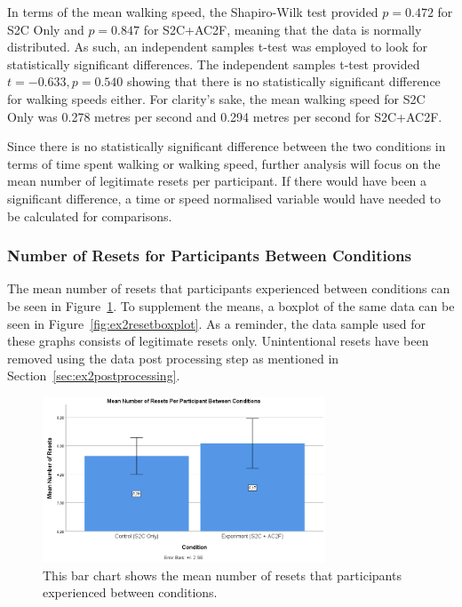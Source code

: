 In terms of the mean walking speed, the Shapiro-Wilk test provided $p = 0.472$ for S2C Only and $p = 0.847$ for S2C+AC2F, meaning that the data is normally distributed. As such, an independent samples t-test was employed to look for statistically significant differences. The independent samples t-test provided $t = -0.633, p = 0.540$ showing that there is no statistically significant difference for walking speeds either. For clarity's sake, the mean walking speed for S2C Only was 0.278 metres per second and 0.294 metres per second for S2C+AC2F.

Since there is no statistically significant difference between the two conditions in terms of time spent walking or walking speed, further analysis will focus on the mean number of legitimate resets per participant. If there would have been a significant difference, a time or speed normalised variable would have needed to be calculated for comparisons. 

\subsubsection{Number of Resets for Participants Between Conditions}
The mean number of resets that participants experienced between conditions can be seen in Figure~\ref{fig:ex2resetMeans}. To supplement the means, a boxplot of the same data can be seen in Figure~\ref{fig:ex2resetboxplot}. As a reminder, the data sample used for these graphs consists of legitimate resets only. Unintentional resets have been removed using the data post processing step as mentioned in Section~\ref{sec:ex2postprocessing}.

\begin{figure}[tbph]
    \centering
    \includegraphics[width=0.75\textwidth]{figures/graphs/ResetMeans.png}
    \caption[Mean Number of Resets Between Conditions for Experiment 2]{This bar chart shows the mean number of resets that participants experienced between conditions.}
    \label{fig:ex2resetMeans}
\end{figure}

